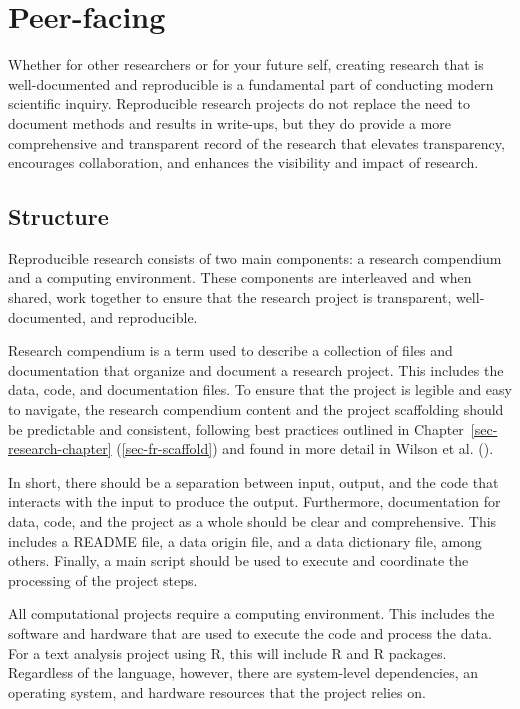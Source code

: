 \documentclass[
  letterpaper,
]{latex/krantz}
\theoremstyle{definition}
\theoremstyle{remark}
\begin{document}
\section{Peer-facing}\label{sec-contr-peer-facing}

Whether for other researchers or for your future self, creating research
that is well-documented and reproducible is a fundamental part of
conducting modern scientific inquiry. Reproducible research projects do
not replace the need to document methods and results in write-ups, but
they do provide a more comprehensive and transparent record of the
research that elevates transparency, encourages collaboration, and
enhances the visibility and impact of research.

\subsection{Structure}\label{sec-contr-ro-structure}

Reproducible research consists of two main components: a research
compendium and a computing environment. These components are interleaved
and when shared, work together to ensure that the research project is
transparent, well-documented, and reproducible.

Research compendium is a term used to describe a collection of files and
documentation that organize and document a research project. This
includes the data, code, and documentation files. To ensure that the
project is legible and easy to navigate, the research compendium content
and the project scaffolding should be predictable and consistent,
following best practices outlined in Chapter~\ref{sec-research-chapter}
(\ref{sec-fr-scaffold}) and found in more detail in Wilson et al.
().

In short, there should be a separation between input, output, and the
code that interacts with the input to produce the output. Furthermore,
documentation for data, code, and the project as a whole should be clear
and comprehensive. This includes a README file, a data origin file, and
a data dictionary file, among others. Finally, a main script should be
used to execute and coordinate the processing of the project steps.

All computational projects require a computing environment. This
includes the software and hardware that are used to execute the code and
process the data. For a text analysis project using R, this will include
R and R packages. Regardless of the language, however, there are
system-level dependencies, an operating system, and hardware resources
that the project relies on.
\end{document}
